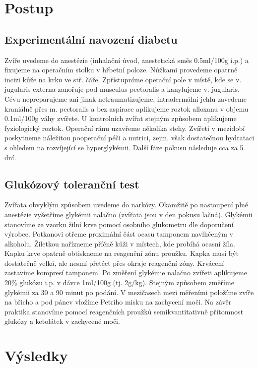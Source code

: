 \documentclass[12pt]{article}
\begin{document}
\section{Postup}
\subsection{Experimentální navození diabetu}
Zvíře uvedeme do anestézie (inhalační úvod, anestetická směs 0.5ml/100g i.p.) a fixujeme na
operačním stolku v hřbetní poloze. Nůžkami provedeme opatrně incizi kůže na krku ve stř. čáře.
Zpřístupníme operační pole v místě, kde se v. jugularis externa zanořuje pod musculus pectoralis
a kanylujeme v. jugularis. Cévu nepreparujeme ani jinak netraumatizujeme, intradermální jehlu
zavedeme kraniálně přes m. pectoralis a bez aspirace aplikujeme roztok alloxanu v objemu
0.1ml/100g váhy zvířete. U kontrolních zvířat stejným způsobem aplikujeme fyziologický roztok.
Operační ránu uzavřeme několika stehy. Zvířeti v mezidobí poskytneme náležitou pooperační
péči a nutrici, zejm. však dostatečnou hydrataci s ohledem na rozvíjející se hyperglykémii. Další
fáze pokusu následuje cca za 5 dní.

\subsection{Glukózový toleranční test}
Zvířata obvyklým způsobem uvedeme do narkózy. Okamžitě po nastoupení plné anestézie
vyšetříme glykémii nalačno (zvířata jsou v den pokusu lačná). Glykémii stanovíme ze vzorku
žilní krve pomocí osobního glukometru dle doporučení výrobce. Potkanovi otřeme proximální
část ocasu tamponem navlhčeným v alkoholu. Žiletkou nařízneme příčně kůži v místech, kde
probíhá ocasní žíla. Kapku krve opatrně obtiskneme na reagenční zónu proužku. Kapka musí být
dostatečně velká, ale nesmí přetéct přes okraje reagenční zóny. Krvácení zastavíme kompresí
tamponem. Po změření glykémie nalačno zvířeti aplikujeme 20\% glukózu i.p. v dávce 1ml/100g
(tj. 2g/kg). Stejným způsobem změříme glykémii za 30 a 90 minut po podání. V mezičasech mezi
měřeními položíme zvíře na břicho a pod pánev vložíme Petriho misku na zachycení moči. Na
závěr praktika stanovíme pomocí reagenčních proužků semikvantitativně přítomnost glukózy a
ketolátek v zachycené moči.

\section{Výsledky}
\end{document}
